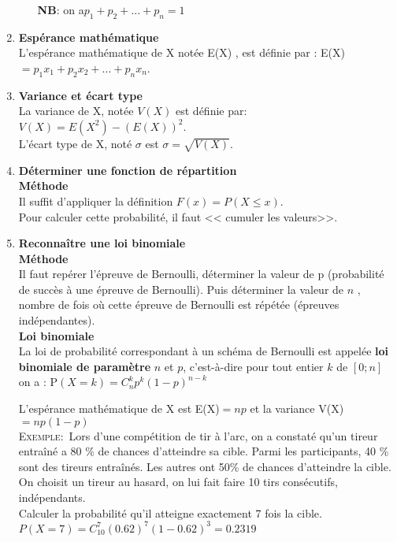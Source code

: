 \begin{enumerate}
\begin{itemize}[label=\bf $ \bullet $]
\textbf{NB}: \quad  on a\quad $  p_1 + p_2+ ... +p_n = 1$
\end{itemize}
\item \textbf{ Espérance mathématique}\\
L'espérance mathématique de X notée E(X) , est  définie par :\; E(X)$ = p_1 x_1 + p_2 x_2 +... + p_n x_n$.
\item \textbf{  Variance et écart type}\\
La variance de X, notée $V(X)$ est  définie par: $  V(X) = E(X^2 ) - (E(X))^2 $.\\
L'écart type de X, noté  $ \sigma $ est \quad  $ \sigma=\sqrt{V(X)} $.  
\item \textbf{Déterminer une fonction de répartition}\\
\textbf{Méthode}\\
Il suffit d'appliquer la définition  $F (x ) = P ( X \leq x ) $.\\
Pour calculer cette probabilité, il faut << cumuler  les valeurs>>.

\item \textbf{Reconnaître une loi binomiale}\\
\textbf{Méthode}\\
Il faut repérer l'épreuve de Bernoulli, déterminer la valeur de p (probabilité de succès à une épreuve de Bernoulli). Puis déterminer
la valeur de $ n $ , nombre de fois où cette épreuve de Bernoulli est répétée (épreuves indépendantes).\\
\textbf{Loi binomiale}\\
La loi de probabilité correspondant à un schéma de Bernoulli est appelée \textbf{loi binomiale de
paramètre} $ n $ et $ p $, c'est-à-dire pour tout entier $ k $ de $[0 ; n]$ on a : P$ (X=k)=C_{n}^{k}p^{k}(1-p)^{n-k} $

\smallskip
L'espérance mathématique de X est E(X)$ =np $ et la variance V(X)$=np(1-p)  $\\

\textsc{Exemple:}\ Lors d'une compétition de tir à l'arc, on a constaté qu'un tireur entraîné a 80 \% de chances d'atteindre sa cible. Parmi les
participants, 40 \% sont des tireurs entraînés. Les autres ont 50\% de chances d'atteindre la cible.\\
On choisit un tireur au hasard, on lui fait faire 10 tirs consécutifs, indépendants.\\
Calculer la probabilité qu'il atteigne exactement 7 fois la cible.\\


\hspace*{3cm}\; $ P(X=7)=C_{10}^7(0.62)^7(1-0.62)^3=0.2319 $
\end{enumerate}
